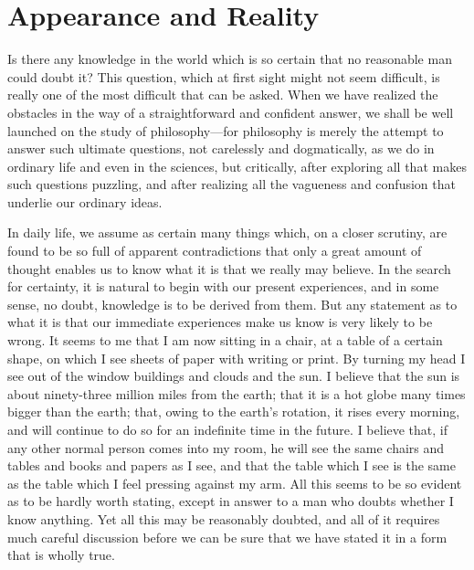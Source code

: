 \documentclass[oneside,letterpaper,12pt]{book}
\begin{document}
\tableofcontents

\mainmatter
\chapter{Appearance and Reality}\label{chapter-i.-appearance-and-reality}
Is there any knowledge in the world which is so certain that no
reasonable man could doubt it? This question, which at first sight might
not seem difficult, is really one of the most difficult that can be
asked. When we have realized the obstacles in the way of a
straightforward and confident answer, we shall be well launched on the
study of philosophy---for philosophy is merely the attempt to answer
such ultimate questions, not carelessly and dogmatically, as we do in
ordinary life and even in the sciences, but critically,\label{reasons} after exploring
all that makes such questions puzzling, and after realizing all the
vagueness and confusion that underlie our ordinary ideas.

In daily life, we assume as certain many things which, on a closer
scrutiny, are found to be so full of apparent contradictions that only a
great amount of thought enables us to know what it is that we really may
believe. In the search for certainty, it is natural to begin with our
present experiences, and in some sense, no doubt, knowledge is to be
derived from them. But any statement as to what it is that our immediate
experiences make us know is very likely to be wrong. It seems to me that
I am now sitting in a chair, at a table of a certain shape, on which I
see sheets of paper with writing or print. By turning my head I see out
of the window buildings and clouds and the sun. I believe that the sun
is about ninety-three million miles from the earth; that it is a hot
globe many times bigger than the earth; that, owing to the
earth's rotation, it rises every morning, and will
continue to do so for an indefinite time in the future. I believe that,
if any other normal person comes into my room, he will see the same
chairs and tables and books and papers as I see, and that the table
which I see is the same as the table which I feel pressing against my
arm. All this seems to be so evident as to be hardly worth stating,
except in answer to a man who doubts whether I know anything. Yet all
this may be reasonably doubted, and all of it requires much careful
discussion before we can be sure that we have stated it in a form that
is wholly true.
\end{document}
